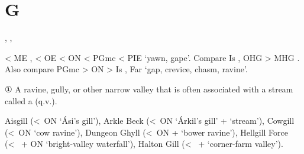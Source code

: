 \documentclass[12pt,letterpaper,oneside,article,draft]{memoir}
\begin{document}
\section*{G}

\begin{Lemma}
\end{Lemma}

\begin{Lemma}
\end{Lemma}

\begin{Lemma}
\begin{Also}
	, , 
\end{Also}
\begin{Etymology}
	< ME ,  < OE  < ON  < PGmc  < PIE  ‘yawn, gape’.
	Compare Is , OHG  > MHG .
	Also compare PGmc  > ON  > Is , Far  ‘gap, crevice, chasm, ravine’.
\end{Etymology}
\begin{Definitions}
	① A ravine, gully, or other narrow valley that is often associated with a stream called a  (q.v.).
\end{Definitions}
\begin{Examples}
	Aisgill (<~ON  ‘Ási’s gill’),
	Arkle Beck (<~ON  ‘Árkil’s gill’ +  ‘stream’),
	Cowgill (<~ON  ‘cow ravine’),
	Dungeon Ghyll (<~ON  +  ‘bower ravine’),
	Hellgill Force (<~ + ON  ‘bright-valley waterfall’),
	Halton Gill (<~ +  ‘corner-farm valley’).
\end{Examples}
\end{Lemma}
\end{document}
